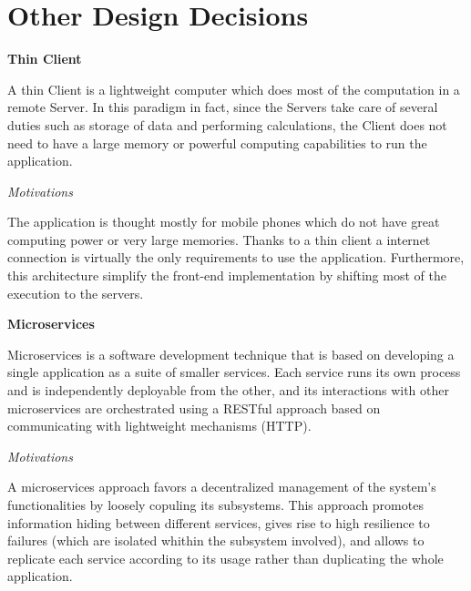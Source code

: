 \documentclass{report}
\begin{document}
\section{Other Design Decisions}
\begin{center}\large{\textbf{Thin Client}}\end{center}
A thin Client is a lightweight computer which does most of the computation in a remote Server. In this paradigm in fact, since the Servers take care of several duties such as storage 
of data and performing calculations, the Client does not need to have a large memory or powerful computing capabilities to run the application.
\begin{center}\large{\textit{Motivations}}\end{center} 
The application is thought mostly for mobile phones which do not have great computing power or very large memories. Thanks to a thin client a internet connection is virtually the only requirements to use the application. Furthermore, this architecture simplify the front-end implementation by shifting most of the execution to the servers.

\vspace{2mm}
\begin{center}\large{\textbf{Microservices}}\end{center}
Microservices is a software development technique that is based on developing a single application as a suite of smaller services. Each service runs its own process and is independently deployable from the other, and its interactions with other microservices are orchestrated using a RESTful approach based on communicating with lightweight mechanisms (HTTP).
\begin{center}\large{\textit{Motivations}}\end{center}
A microservices approach favors a decentralized management of the system's functionalities by loosely copuling its subsystems. This approach promotes information hiding between different services, gives rise to high resilience to failures (which are isolated whithin the subsystem involved), and allows to replicate each service according to its usage rather than duplicating the whole application. 
\end{document}
